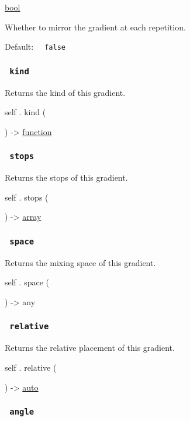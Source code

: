 \href{/docs/reference/foundations/bool/}{bool}

Whether to mirror the gradient at each repetition.

Default: \texttt{\ }{\texttt{\ false\ }}\texttt{\ }

\subsubsection{\texorpdfstring{\texttt{\ kind\ }}{ kind }}\label{definitions-kind}

Returns the kind of this gradient.

self { . } { kind } (

) -\textgreater{} \href{/docs/reference/foundations/function/}{function}

\subsubsection{\texorpdfstring{\texttt{\ stops\ }}{ stops }}\label{definitions-stops}

Returns the stops of this gradient.

self { . } { stops } (

) -\textgreater{} \href{/docs/reference/foundations/array/}{array}

\subsubsection{\texorpdfstring{\texttt{\ space\ }}{ space }}\label{definitions-space}

Returns the mixing space of this gradient.

self { . } { space } (

) -\textgreater{} { any }

\subsubsection{\texorpdfstring{\texttt{\ relative\ }}{ relative }}\label{definitions-relative}

Returns the relative placement of this gradient.

self { . } { relative } (

) -\textgreater{} \href{/docs/reference/foundations/auto/}{auto}

\subsubsection{\texorpdfstring{\texttt{\ angle\ }}{ angle }}\label{definitions-angle}

